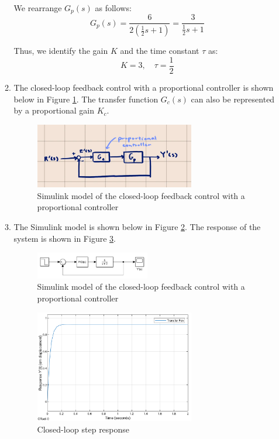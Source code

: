 \documentclass[12pt]{article}
\begin{document}
\begin{enumerate}
\begin{enumerate}
    We rearrange \( G_p(s) \) as follows:
    \[
    G_p(s) = \frac{6}{2(\frac{1}{2}s + 1)} = \frac{3}{\frac{1}{2}s + 1}
    \]

    Thus, we identify the gain \( K \) and the time constant \( \tau \) as:
    \[
    K = 3, \quad \tau = \frac{1}{2}
    \]

    \item 
    The closed-loop feedback control with a proportional controller is shown below in Figure \ref{fig:figure1_3}. The transfer function $G_c(s)$ can also be represented by a proportional gain $K_c$.

    \begin{figure}[H]
      \centering
      \includegraphics[width=0.7\textwidth]{Figures/Models/model1_2.png}
      \caption{Simulink model of the closed-loop feedback control with a proportional controller}
      \label{fig:figure1_3}
    \end{figure}
    
    \item 
    The Simulink model is shown below in Figure \ref{fig:figure1_4}. The response of the system is shown in Figure \ref{fig:figure1_5}.

    \begin{figure}[H]
      \centering
      \includegraphics[width=0.5\textwidth]{Figures/Models/model1_3.png}
      \caption{Simulink model of the closed-loop feedback control with a proportional controller}
      \label{fig:figure1_4}
    \end{figure}

    \begin{figure}[H]
      \centering
      \includegraphics[width=0.7\textwidth]{Figures/figure1_3.png}
      \caption{Closed-loop step response}
      \label{fig:figure1_5}
    \end{figure}


\end{enumerate}
\end{enumerate}
\end{document}
